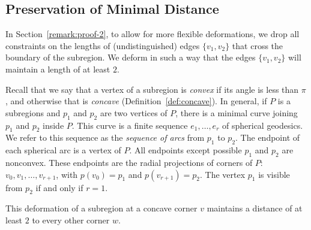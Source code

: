 \subsection{Preservation of Minimal Distance}
    \label{sec:proof-2}


\begin{remark}
\label{flexremark} In Section~\ref{remark:proof-2}, to allow for
more flexible deformations, we drop all constraints on the lengths
of (undistinguished) edges $\{v_1,v_2\}$ that cross the boundary of
the subregion.  We deform in such a way that the edges $\{v_1,v_2\}$
will maintain a length of at least $2$.
\end{remark}


Recall that we say that a vertex of a subregion is {\it convex\/}
if its angle is less than $\pi$, and otherwise that is {\it
concave}
(Definition~\ref{def:concave}).
%
In general, if $P$ is a subregions and $p_1$ and $p_2$ are two
vertices of $P$, there is a minimal curve joining $p_1$ and $p_2$
inside $P$.  This curve is a finite sequence $e_1,\ldots, e_r$ of
spherical geodesics.  We refer to this sequence as the {\it sequence
of arcs\/}  from $p_1$ to $p_2$. The endpoint of
each spherical arc is a vertex of $P$. All endpoints except possible
$p_1$ and $p_2$ are nonconvex. These endpoints are the radial
projections of corners of $P$: $v_0,v_1,\ldots,v_{r+1}$, with
$p(v_0)=p_1$ and $p(v_{r+1})=p_2$. The vertex $p_1$ is visible from
$p_2$ if and only if $r=1$.


\begin{lemma}\label{dist2}
This deformation of a subregion at a concave corner $v$ maintains
a distance of at least $2$ to every other corner $w$.
\end{lemma}

